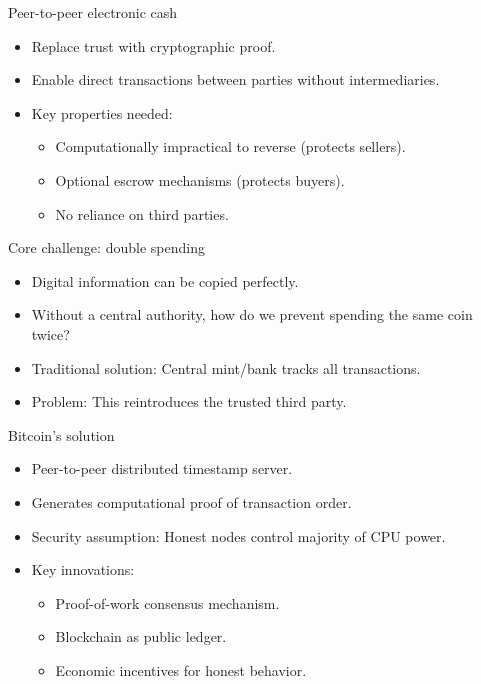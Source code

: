 \documentclass[aspectratio=169, lualatex, handout]{beamer}
\begin{document}
\begin{frame}{Peer-to-peer electronic cash}
	\begin{itemize}
		\item Replace trust with cryptographic proof.
		\item Enable direct transactions between parties without intermediaries.
		\item Key properties needed:
		      \begin{itemize}
			      \item Computationally impractical to reverse (protects sellers).
			      \item Optional escrow mechanisms (protects buyers).
			      \item No reliance on third parties.
		      \end{itemize}
	\end{itemize}
\end{frame}

\begin{frame}{Core challenge: double spending}
	\begin{itemize}
		\item Digital information can be copied perfectly.
		\item Without a central authority, how do we prevent spending the same coin twice?
		\item Traditional solution: Central mint/bank tracks all transactions.
		\item Problem: This reintroduces the trusted third party.
	\end{itemize}
\end{frame}

\begin{frame}{Bitcoin's solution}
	\begin{itemize}
		\item Peer-to-peer distributed timestamp server.
		\item Generates computational proof of transaction order.
		\item Security assumption: Honest nodes control majority of CPU power.
		\item Key innovations:
		      \begin{itemize}
			      \item Proof-of-work consensus mechanism.
			      \item Blockchain as public ledger.
			      \item Economic incentives for honest behavior.
		      \end{itemize}
	\end{itemize}
\end{frame}
\end{document}
